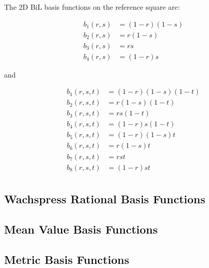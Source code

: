 The 2D BiL basis functions on the reference square are:

\begin{equation}
\label{eq::BiL_basis_functions}
\begin{aligned}
	b_1(r,s) & = (1-r)(1-s) \\
	b_2(r,s) & = r(1-s) \\
	b_3(r,s) & = rs \\
	b_4(r,s) & = (1-r)s
\end{aligned}
\end{equation}

\noindent and

\begin{equation}
\label{eq::TriL_basis_functions}
\begin{aligned}
	b_1(r,s,t) & = (1-r)(1-s)(1-t) \\
	b_2(r,s,t) & = r(1-s)(1-t) \\
	b_3(r,s,t) & = rs(1-t) \\
	b_4(r,s,t) & = (1-r)s(1-t) \\
	b_5(r,s,t) & = (1-r)(1-s)t \\
	b_6(r,s,t) & = r(1-s)t \\
	b_7(r,s,t) & = rst \\
	b_8(r,s,t) & = (1-r)st \\
\end{aligned}
\end{equation}

\subsection{Wachspress Rational Basis Functions}
\label{sec::BF_Linear_Wachspress}

\subsection{Mean Value Basis Functions}
\label{sec::BF_Linear_MV}

\subsection{Metric Basis Functions}
\label{sec::BF_Linear_Metric}

